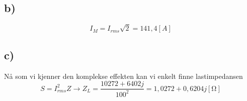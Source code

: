 \documentclass[12pt,a4paper]{article}
\begin{document}
    \subsection*{b)}
    \begin{equation}
      I_M = I_{rms}\sqrt{2} = 141,4[A]
    \end{equation}

    \subsection*{c)}
    Nå som vi kjenner den komplekse effekten kan vi enkelt finne lastimpedansen
    \begin{equation}
      S = I_{rms}^2 Z \rightarrow Z_L = \frac{10272+6402j}{100^2} = 1,0272 + 0,6204j[\si{\ohm}]
    \end{equation}
\end{document}
